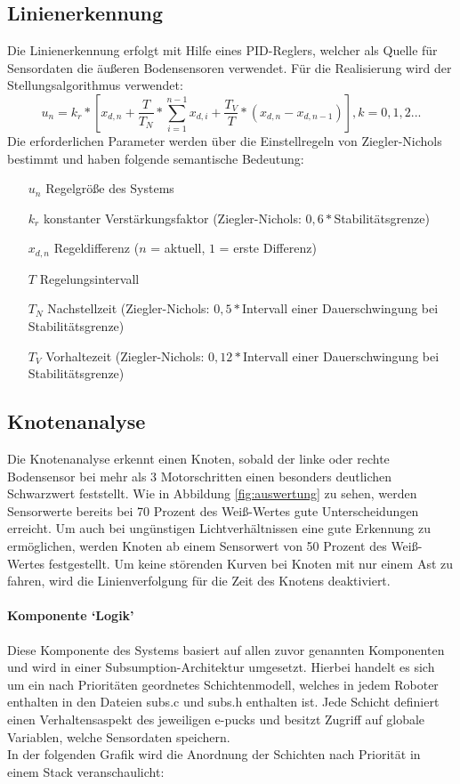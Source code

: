 \documentclass[10pt,a4paper]{article}
\begin{document}
		\subsection{Linienerkennung}
			Die Linienerkennung erfolgt mit Hilfe eines PID-Reglers, welcher als Quelle für Sensordaten die äußeren Bodensensoren verwendet.
			Für die Realisierung wird der Stellungsalgorithmus verwendet:
			\begin{equation}
				u_n = k_r * \left[ x_{d,n} + \frac{T}{T_N} * \sum_{i=1}^{n-1}x_{d,i} + \frac{T_V}{T}*(x_{d,n}-x_{d,n-1}) \right], k=0,1,2...
			\end{equation}
			Die erforderlichen Parameter werden über die Einstellregeln von Ziegler-Nichols bestimmt und haben folgende semantische Bedeutung:
			\begin{itemize}
				\item[$u_n$] Regelgröße des Systems
				\item[$k_r$] konstanter Verstärkungsfaktor (Ziegler-Nichols: $0,6 * $Stabilitätsgrenze)
				\item[$x_{d,n}$] Regeldifferenz ($n$ = aktuell, $1$ = erste Differenz)
				\item[$T$] Regelungsintervall
				\item[$T_N$] Nachstellzeit (Ziegler-Nichols: $0,5 * $Intervall einer Dauerschwingung bei Stabilitätsgrenze)
				\item[$T_V$] Vorhaltezeit (Ziegler-Nichols: $0,12 * $Intervall einer Dauerschwingung bei Stabilitätsgrenze)
			\end{itemize}		
			\subsection{Knotenanalyse}
			Die Knotenanalyse erkennt einen Knoten, sobald der linke oder rechte Bodensensor bei mehr als 3 Motorschritten einen besonders
			deutlichen Schwarzwert feststellt. Wie in Abbildung \ref{fig:auswertung} zu sehen, werden Sensorwerte bereits bei 70 Prozent des
			Weiß-Wertes gute Unterscheidungen erreicht. Um auch bei ungünstigen Lichtverhältnissen eine gute Erkennung zu ermöglichen,
			werden Knoten ab einem Sensorwert von 50 Prozent des Weiß-Wertes festgestellt. Um keine störenden Kurven bei Knoten mit nur einem
			Ast zu fahren, wird die Linienverfolgung für die Zeit des Knotens deaktiviert. 

		\paragraph*{Komponente `Logik'}
			Diese Komponente des Systems basiert auf allen zuvor genannten Komponenten und wird in einer Subsumption-Architektur umgesetzt. Hierbei
			handelt es sich um ein nach Prioritäten geordnetes Schichtenmodell, welches in jedem Roboter enthalten in den Dateien subs.c und subs.h enthalten
			ist. Jede Schicht definiert einen Verhaltensaspekt des jeweiligen e-pucks und besitzt Zugriff auf globale Variablen, welche Sensordaten speichern. \\
                                    In der folgenden Grafik wird die Anordnung der Schichten nach Priorität in einem Stack veranschaulicht: \\ 
\end{document}
